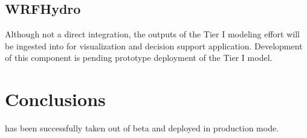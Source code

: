 \documentclass[letterpaper,12pt,english,openany,oneside]{sphinxmanual}
\begin{document}
\subsection{WRF\sphinxhyphen{}Hydro}
\label{\detokenize{euidev/integrations/index:wrf-hydro}}
\sphinxAtStartPar
Although not a direct integration, the outputs of the Tier I modeling effort will be ingested into {\hyperref[\detokenize{_static/glossary:term-RGVFlood.com}]{}} for visualization and decision support application.  Development of this component is pending prototype deployment of the Tier I model.

\sphinxstepscope


\section{Conclusions}
\label{\detokenize{euidev/conclusions/index:conclusions}}\label{\detokenize{euidev/conclusions/index::doc}}
\sphinxAtStartPar
{\hyperref[\detokenize{_static/glossary:term-RGVFlood.com}]{}} has been successfully taken out of beta and deployed in production mode.
\end{document}

